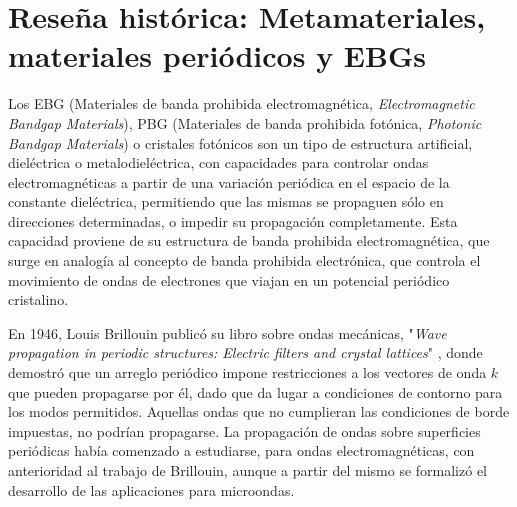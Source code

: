 
\section{Reseña histórica: Metamateriales, materiales periódicos y EBGs}
\label{sec_resenia_metamateriales}

Los EBG (Materiales de banda prohibida electromagnética, \textit{Electromagnetic Bandgap Materials}), PBG (Materiales de banda prohibida fotónica, \textit{Photonic Bandgap Materials}) o cristales fotónicos son un tipo de estructura artificial, dieléctrica o metalodieléctrica, con capacidades para controlar ondas electromagnéticas \cite{Engheta} a partir de una variación periódica en el espacio de la constante dieléctrica, permitiendo que las mismas se propaguen sólo en direcciones determinadas, o impedir su propagación completamente. Esta capacidad proviene de su estructura de banda prohibida electromagnética, que surge en analogía al concepto de banda prohibida electrónica, que controla el movimiento de ondas de electrones que viajan en un potencial periódico cristalino.

En 1946, Louis Brillouin publicó su libro sobre ondas mecánicas, "\textit{Wave propagation in periodic structures: Electric filters and crystal lattices}" \cite{Brillouin:WavePropagation}, donde demostró que un arreglo periódico impone restricciones a los vectores de onda $k$ que pueden propagarse por él, dado que da lugar a condiciones de contorno para los modos permitidos. Aquellas ondas que no cumplieran las condiciones de borde impuestas, no podrían propagarse. La propagación de ondas sobre superficies periódicas había comenzado a estudiarse, para ondas electromagnéticas, con anterioridad al trabajo de Brillouin, aunque a partir del mismo se formalizó el desarrollo de las aplicaciones para microondas.

